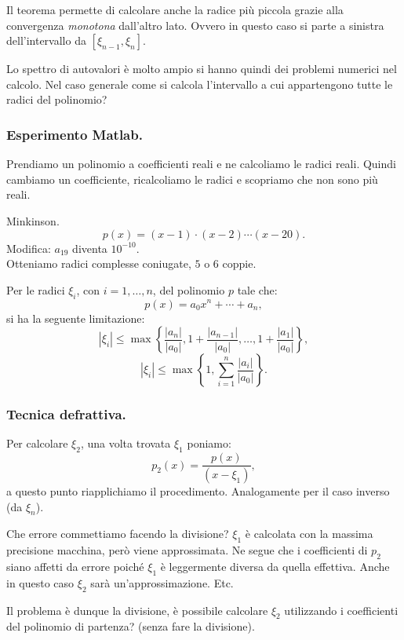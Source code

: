 Il teorema permette di calcolare anche la radice più piccola grazie alla
convergenza \emph{monotona} dall'altro lato. Ovvero in questo caso si parte
a sinistra dell'intervallo da $[\xi_{n-1}, \xi_n]$.

Lo spettro di autovalori è molto ampio si hanno quindi dei problemi numerici
nel calcolo. Nel caso generale come si calcola l'intervallo a cui appartengono
tutte le radici del polinomio?

\subsubsection{Esperimento Matlab.}
Prendiamo un polinomio a coefficienti reali e ne calcoliamo le radici reali.
Quindi cambiamo un coefficiente, ricalcoliamo le radici e scopriamo che
non sono più reali.

\begin{exe}Minkinson.\\
\[p(x) = (x-1)\cdot (x-2) \cdots (x-20).\]
Modifica: $a_{19}$ diventa $10^{-10}$.\\

Otteniamo radici complesse coniugate, $5$ o $6$ coppie.
\end{exe} 

\begin{teo}
Per le radici $\xi_i$, con $i = 1, \ldots, n $, del polinomio $p$ tale che:
\[
p(x) = a_0x^n + \cdots + a_n,
\] 
si ha la seguente limitazione:
\[
|\xi_i| \leq \max\left\{ \frac{|a_n|}{|a_0|}, 1+\frac{|a_{n-1}|}{|a_0|},
\ldots, 1 + \frac{|a_{1}|}{|a_0|}\right\},
\]
\[
|\xi_i| \leq \max\left\{
1, \sum_{i=1}^n\frac{|a_{i}|}{|a_0|}
\right\}.
\]
\end{teo}

\subsubsection{Tecnica defrattiva.}
Per calcolare $\xi_2$, una volta trovata $\xi_1$ poniamo:
\[
p_2(x) = \frac{p(x)}{(x-\xi_1)},
\]
a questo punto riapplichiamo il procedimento. Analogamente per
il caso inverso (da $\xi_n$).

Che errore commettiamo facendo la divisione? $\xi_1$ è calcolata con la 
massima precisione macchina, però viene approssimata. Ne segue che i 
coefficienti di $p_2$ siano affetti da errore poiché $\xi_1$ è leggermente
diversa da quella effettiva. Anche in questo caso $\xi_2$ sarà 
un'approssimazione. Etc.

Il problema è dunque la divisione, è possibile calcolare $\xi_2$ utilizzando
i coefficienti del polinomio di partenza? (senza fare la divisione).


